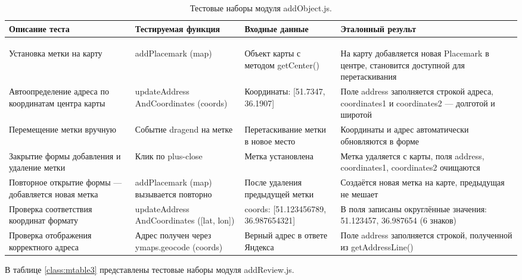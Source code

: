 \renewcommand{\arraystretch}{0.8} %
\begin{xltabular}{\textwidth}{|X|X|X|X|}
	\caption{Тестовые наборы модуля addObject.js.\label{class:mtable2}}\\
	\hline \centrow Описание теста & \centrow Тестируемая функция & \centrow Входные данные & \centrow Эталонный результ\\
	\hline {} &  &  & \\ \hline
	\endfirsthead
	\\
	\hline {} &  &  & \\ \hline
	\finishhead
	Установка метки на карту & addPlacemark (map) & Объект карты с методом getCenter() & На карту добавляется новая Placemark в центре, становится доступной для перетаскивания\\
	\hline Автоопределение адреса по координатам центра карты & updateAddress AndCoordinates (coords) & Координаты: [51.7347, 36.1907] & Поле address заполняется строкой адреса, coordinates1 и coordinates2 — долготой и широтой\\
	\hline Перемещение метки вручную & Событие dragend на метке & Перетаскивание метки в новое место & Координаты и адрес автоматически обновляются в форме\\
	\hline Закрытие формы добавления и удаление метки & Клик по plus-close & Метка установлена & Метка удаляется с карты, поля address, coordinates1, coordinates2 очищаются\\
	\hline Повторное открытие формы — добавляется новая метка & addPlacemark (map) вызывается повторно & После удаления предыдущей метки & Создаётся новая метка на карте, предыдущая не мешает\\
	\hline Проверка соответствия координат формату & updateAddress AndCoordinates ([lat, lon]) & coords: [51.123456789, 36.987654321] & В поля записаны округлённые значения: 51.123457, 36.987654 (6 знаков)\\
	\hline Проверка отображения корректного адреса & Адрес получен через ymaps.geocode (coords) & Верный адрес в ответе Яндекса & Поле address заполняется строкой, полученной из getAddressLine()\\
\end{xltabular}

В таблице \ref{class:mtable3} представлены тестовые наборы модуля addReview.js.

